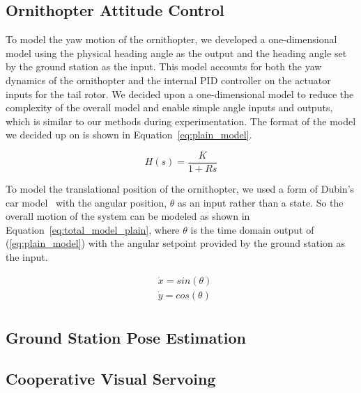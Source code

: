 \documentclass{aamas2013}
\begin{document}
\subsection{Ornithopter Attitude Control}
\label{sec:model_attitude}

To model the yaw motion of the ornithopter, we developed a one-dimensional model using the physical heading angle as the output and the heading angle set by the ground station as the input. This model accounts for both the yaw dynamics of the ornithopter and the internal PID controller on the actuator inputs for the tail rotor. We decided upon a one-dimensional model to reduce the complexity of the overall model and enable simple angle inputs and outputs, which is similar to our methods during experimentation. The format of the model we decided up on is shown in Equation~\ref{eq:plain_model}.

\begin{equation}
\label{eq:plain_model}
H(s) = \frac{K}{1 + Rs}
\end{equation}

To model the translational position of the ornithopter, we used a form of Dubin's car model~\cite{lavalle:planning} with the angular position, $\theta$ as an input rather than a state. So the overall motion of the system can be modeled as shown in Equation~\ref{eq:total_model_plain}, where $\theta$ is the time domain output of (\ref{eq:plain_model}) with the angular setpoint provided by the ground station as the input.

\begin{equation}
\label{eq:total_model_plain}
\begin{aligned}
& \dot{x} = sin(\theta)\\
& \dot{y} = cos(\theta)\\
\end{aligned}
\end{equation}

\subsection{Ground Station Pose Estimation}

\subsection{Cooperative Visual Servoing}
\end{document}
